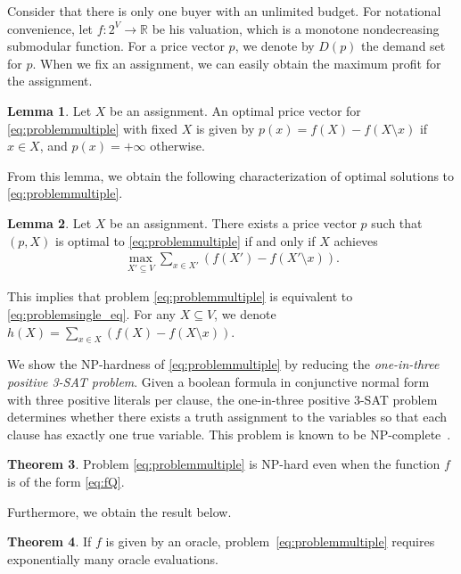 \documentclass[letterpaper]{article}
\theoremstyle{definition}
\newtheorem{theorem}{Theorem}
\newtheorem{lemma}[theorem]{Lemma}
\newcommand{\COMM}[2]{{
\begin{CJK}{UTF8}{ipxm}
\ifthenelse{\equal{#1}{TM}}{\color{blue}}{
\ifthenelse{\equal{#1}{YK}}{\color{red}}{
\ifthenelse{\equal{#1}{HS}}{\color{cyan}}{
\ifthenelse{\equal{#1}{KK}}{\color{magenta}}}}}
[#1: #2]
\end{CJK}
}}
\begin{document}
Consider that there is only one buyer with an unlimited budget.
For notational convenience, let $f: 2^V \to \mathbb{R}$ be his valuation, which is a monotone nondecreasing submodular function.
For a price vector $p$, we denote by $D(p)$ the demand set for $p$.
When we fix an assignment, we can easily obtain the maximum profit for the assignment.
\begin{lemma}\label{lem:single_obs}
Let $X$ be an assignment.
An optimal price vector for \eqref{eq:problemmultiple} with fixed $X$ is given by
$p(x) = f(X)-f(X \setminus x)$ if $x \in X$, and $p(x)=+\infty$ otherwise.
\end{lemma}
From this lemma, we obtain the following characterization of optimal solutions to \eqref{eq:problemmultiple}.
\begin{lemma}\label{lem:Dtoh}
Let $X$ be an assignment.
There exists a price vector $p$ such that $(p, X)$ is optimal to  \eqref{eq:problemmultiple} if and only if $X$ achieves
\begin{align}\label{eq:problemsingle_eq}
\textstyle
  \max_{X' \subseteq V} \sum_{x \in X'} (f(X') - f(X' \setminus x)).
\end{align}
\end{lemma}
This implies that problem \eqref{eq:problemmultiple} is equivalent to \eqref{eq:problemsingle_eq}.
For any $X \subseteq V$, we denote \(h(X) = \sum_{x \in X} (f(X) - f(X \setminus x))\).

We show the NP-hardness of \eqref{eq:problemmultiple} by reducing the \emph{one-in-three positive 3-SAT problem}.
Given a boolean formula in conjunctive normal form with three positive literals per clause, the one-in-three positive 3-SAT problem determines whether there exists a truth assignment to the variables so that each clause has exactly one true variable.
This problem is known to be NP-complete~\cite{schaefer1978complexity}.

\begin{theorem}
\label{thm:NPhard}
Problem \eqref{eq:problemmultiple} is NP-hard even when the function $f$ is of the form \eqref{eq:fQ}.
\end{theorem}


Furthermore, we obtain the result below.
\begin{theorem}
\label{thm:exporacle}
If $f$ is given by an oracle, problem~\eqref{eq:problemmultiple} requires exponentially many oracle evaluations.
\end{theorem}
\end{document}
